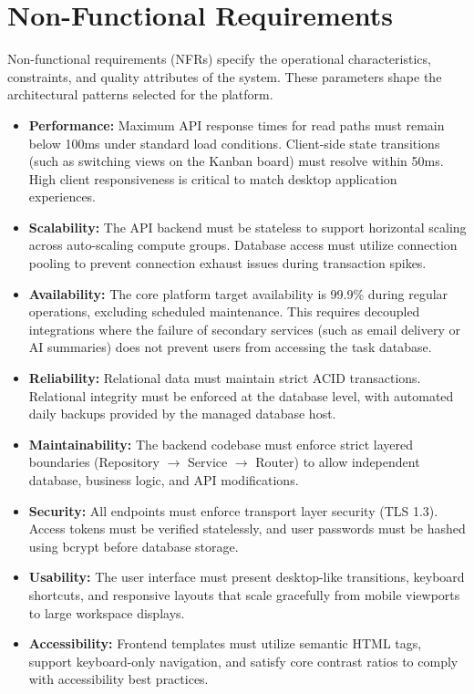 \section{Non-Functional Requirements}
Non-functional requirements (NFRs) specify the operational characteristics, constraints, and quality attributes of the system. These parameters shape the architectural patterns selected for the platform.

\begin{itemize}
    \item \textbf{Performance:} Maximum API response times for read paths must remain below 100ms under standard load conditions. Client-side state transitions (such as switching views on the Kanban board) must resolve within 50ms. High client responsiveness is critical to match desktop application experiences.
    \item \textbf{Scalability:} The API backend must be stateless to support horizontal scaling across auto-scaling compute groups. Database access must utilize connection pooling to prevent connection exhaust issues during transaction spikes.
    \item \textbf{Availability:} The core platform target availability is 99.9\% during regular operations, excluding scheduled maintenance. This requires decoupled integrations where the failure of secondary services (such as email delivery or AI summaries) does not prevent users from accessing the task database.
    \item \textbf{Reliability:} Relational data must maintain strict ACID transactions. Relational integrity must be enforced at the database level, with automated daily backups provided by the managed database host.
    \item \textbf{Maintainability:} The backend codebase must enforce strict layered boundaries (Repository $\rightarrow$ Service $\rightarrow$ Router) to allow independent database, business logic, and API modifications.
    \item \textbf{Security:} All endpoints must enforce transport layer security (TLS 1.3). Access tokens must be verified statelessly, and user passwords must be hashed using bcrypt before database storage.
    \item \textbf{Usability:} The user interface must present desktop-like transitions, keyboard shortcuts, and responsive layouts that scale gracefully from mobile viewports to large workspace displays.
    \item \textbf{Accessibility:} Frontend templates must utilize semantic HTML tags, support keyboard-only navigation, and satisfy core contrast ratios to comply with accessibility best practices.

\end{itemize}
